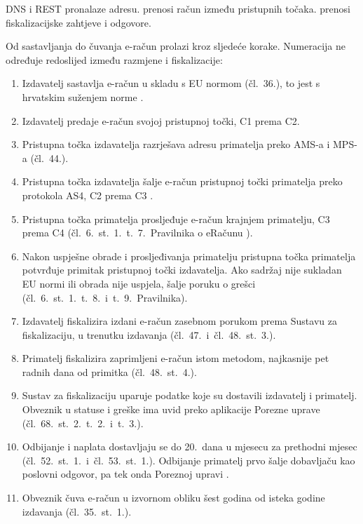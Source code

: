 DNS i REST pronalaze adresu. 
prenosi račun između pristupnih točaka.
 prenosi fiskalizacijske
zahtjeve i odgovore.

Od sastavljanja do čuvanja e-račun prolazi kroz sljedeće korake. Numeracija
ne određuje redoslijed između razmjene i fiskalizacije:

\begin{enumerate}[itemsep=2pt, topsep=4pt]
  \item Izdavatelj sastavlja e-račun u skladu s EU normom (čl.~36.), to
    jest s hrvatskim suženjem norme \cite{pu2026hrcius}.
  \item Izdavatelj predaje e-račun svojoj pristupnoj točki, C1 prema C2.
  \item Pristupna točka izdavatelja razrješava adresu primatelja preko
    AMS-a i MPS-a (čl.~44.).
  \item Pristupna točka izdavatelja šalje e-račun pristupnoj točki
    primatelja preko protokola AS4, C2 prema C3 \cite{pu2025as4profil}.
  \item Pristupna točka primatelja prosljeđuje e-račun krajnjem primatelju,
    C3 prema C4 (čl.~6.~st.~1.~t.~7.\ Pravilnika o
    eRačunu \cite{nn2026pravilnikeracun}).
  \item Nakon uspješne obrade i prosljeđivanja primatelju pristupna točka
    primatelja potvrđuje primitak pristupnoj točki izdavatelja. Ako sadržaj
    nije sukladan EU normi ili obrada nije uspjela, šalje poruku o grešci
    (čl.~6.~st.~1.~t.~8.\ i~t.~9.\ Pravilnika).

  \item Izdavatelj fiskalizira izdani e-račun zasebnom porukom prema
    Sustavu za fiskalizaciju, u trenutku izdavanja
    (čl.~47.\ i~čl.~48.~st.~3.).
  \item Primatelj fiskalizira zaprimljeni e-račun istom metodom, najkasnije
    pet radnih dana od primitka (čl.~48.~st.~4.).
  \item Sustav za fiskalizaciju uparuje podatke koje su dostavili
    izdavatelj i primatelj. Obveznik u statuse i greške ima uvid preko
    aplikacije Porezne uprave (čl.~68.~st.~2.~t.~2.\ i~t.~3.).
  \item Odbijanje i naplata dostavljaju se do 20.~dana u mjesecu za
    prethodni mjesec (čl.~52.~st.~1.\ i~čl.~53.~st.~1.). Odbijanje
    primatelj prvo šalje dobavljaču kao poslovni odgovor, pa tek onda
    Poreznoj upravi \cite{pu2026aplikacijskiodgovor}.
  \item Obveznik čuva e-račun u izvornom obliku šest godina od isteka
    godine izdavanja (čl.~35.~st.~1.).
\end{enumerate}

